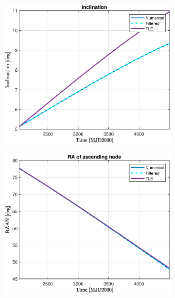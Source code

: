 \documentclass{article}
\begin{document}
\begin{figure}[H]
	\vspace{1cm} %
	\begin{subfigure}[b]{0.45\textwidth}
		\includegraphics[width=\textwidth]{i_TLE.eps}
		\caption{}
		\label{fig:1c}
	\end{subfigure}%
    \hfill
	\begin{subfigure}[b]{0.45\textwidth}
		\includegraphics[width=\textwidth]{RAAN_TLE.eps}
		\caption{}
		\label{fig:1d}
	\end{subfigure}%
	

\end{figure}
\end{document}
